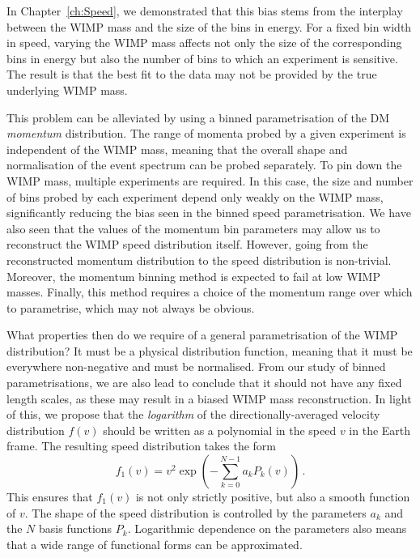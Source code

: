 In Chapter~\ref{ch:Speed}, we demonstrated that this bias stems from the interplay between the WIMP mass and the size of the bins in energy. For a fixed bin width in speed, varying the WIMP mass affects not only the size of the corresponding bins in energy but also the number of bins to which an experiment is sensitive. The result is that the best fit to the data may not be provided by the true underlying WIMP mass.

This problem can be alleviated by using a binned parametrisation of the DM \textit{momentum} distribution. The range of momenta probed by a given experiment is independent of the WIMP mass, meaning that the overall shape and normalisation of the event spectrum can be probed separately. To pin down the WIMP mass, multiple experiments are required. In this case, the size and number of bins probed by each experiment depend only weakly on the WIMP mass, significantly reducing the bias seen in the binned speed parametrisation. We have also seen that the values of the momentum bin parameters may allow us to reconstruct the WIMP speed distribution itself. However, going from the reconstructed momentum distribution to the speed distribution is non-trivial. Moreover, the momentum binning method is expected to fail at low WIMP masses. Finally, this method requires a choice of the momentum range over which to parametrise, which may not always be obvious.

What properties then do we require of a general parametrisation of the WIMP distribution? It must be a physical distribution function, meaning that it must be everywhere non-negative and must be normalised. From our study of binned parametrisations, we are also lead to conclude that it should not have any fixed length scales, as these may result in a biased WIMP mass reconstruction. In light of this, we propose that the \textit{logarithm} of the directionally-averaged velocity distribution $f(v)$ should be written as a polynomial in the speed $v$ in the Earth frame. The resulting speed distribution takes the form
\begin{equation}
f_1(v) = v^2 \exp \left(-\sum_{k=0}^{N-1} a_k P_k(v)\right)\,.
\end{equation}
This ensures that $f_1(v)$ is not only strictly positive, but also a smooth function of $v$. The shape of the speed distribution is controlled by the parameters $a_k$ and the $N$ basis functions $P_k$. Logarithmic dependence on the parameters also means that a wide range of functional forms can be approximated.

